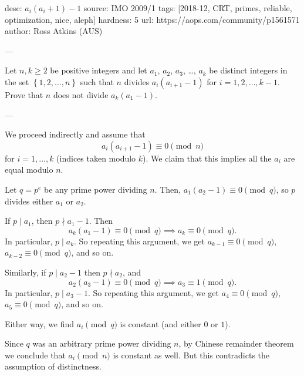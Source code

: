 desc:  $a_i(a_i+1)-1$
source:  IMO 2009/1
tags:  [2018-12, CRT, primes, reliable, optimization, nice, aleph]
hardness: 5
url: https://aops.com/community/p1561571
author: Ross Atkins (AUS)

---

Let $n, k \ge 2$ be positive integers and let $a_1$, $a_2$, $a_3$, \dots, $a_k$
be distinct integers in the set $\left\{ 1,2,\dots,n \right\}$
such that $n$ divides $a_i(a_{i+1} - 1)$ for $i = 1,2,\dots,k-1$.
Prove that $n$ does not divide $a_k(a_1 - 1)$.

---

We proceed indirectly and assume that
\[ a_i (a_{i+1}-1) \equiv 0 \pmod n \]
for $i = 1, \dots, k$ (indices taken modulo $k$).
We claim that this implies all the $a_i$ are equal modulo $n$.

Let $q = p^e$ be any prime power dividing $n$.
Then, $a_1 (a_2 - 1) \equiv 0 \pmod q$, so $p$ divides either $a_1$ or $a_2$.
\begin{itemize}
  \ii If $p \mid a_1$, then $p \nmid a_1 - 1$. Then
  \[ a_k (a_1-1) \equiv 0 \pmod q \implies a_k \equiv 0 \pmod q. \]
  In particular, $p \mid a_k$.
  So repeating this argument,
  we get $a_{k-1} \equiv 0 \pmod q$, $a_{k-2} \equiv 0 \pmod q$, and so on.

  \ii Similarly, if $p \mid a_2 - 1$ then $p \nmid a_2$, and
  \[ a_2 (a_3-1) \equiv 0 \pmod q \implies a_3 \equiv 1 \pmod q.  \]
  In particular, $p \mid a_3 - 1$.
  So repeating this argument,
  we get $a_4 \equiv 0 \pmod q$, $a_5 \equiv 0 \pmod q$, and so on.
\end{itemize}
Either way, we find $a_i \pmod q$ is constant (and either $0$ or $1$).

Since $q$ was an arbitrary prime power dividing $n$,
by Chinese remainder theorem we conclude that $a_i \pmod n$ is constant as well.
But this contradicts the assumption of distinctness.
